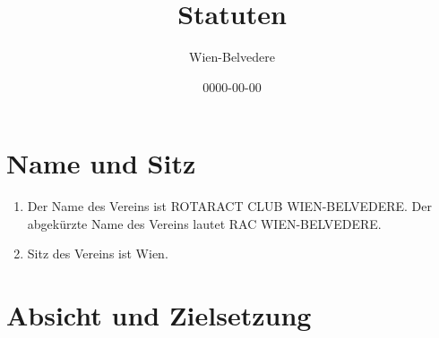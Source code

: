 \documentclass{statutclass}
\title{Statuten}
\author{Wien-Belvedere}
\date{0000-00-00}  %
\begin{document}
\maketitle
\tableofcontents
\clearpage

\section{Name und Sitz}
\begin{enumerate}
    \item Der Name des Vereins ist ROTARACT CLUB WIEN-BELVEDERE. Der abgekürzte Name des Vereins lautet RAC WIEN-BELVEDERE.
    \item Sitz des Vereins ist Wien.
\end{enumerate}

\section{Absicht und Zielsetzung}
\end{document}
